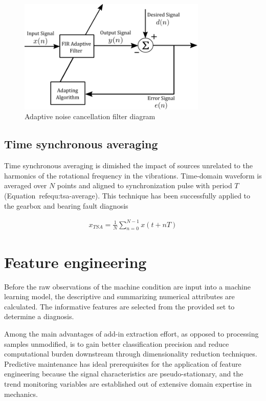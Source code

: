 \begin{figure}[h]
	\centering
	\includegraphics[width=0.8\textwidth]{assets/adaptive-filter.png}
	\caption{Adaptive noise cancellation filter diagram}
	\label{fig:adaptive-filter}
\end{figure}
\bigbreak

\subsection{Time synchronous averaging}
Time synchronous averaging is dimished the impact of sources unrelated to the harmonics of the rotational frequency in the vibrations. Time-domain waveform is averaged over $N$ points and aligned to synchronization pulse with period $T$ (Equation~ref{equ:tsa-average}). This technique has been successfully applied to the gearbox and bearing fault diagnosis~\cite{davies_handbook_2012,nandi_condition_2019}
\begin{ceqn}\begin{align}
x_{TSA} = \frac{1}{N} \sum_{n = 0}^{N - 1}{x(t + nT)}
\label{equ:tsa-average}
\end{align}\end{ceqn}

\section{Feature engineering}
Before the raw observations of the machine condition are input into a machine learning model, the descriptive and summarizing numerical attributes are calculated. The informative features are selected from the provided set to determine a diagnosis.

Among the main advantages of add-in extraction effort, as opposed to processing samples unmodified, is to gain better classification precision and reduce computational burden downstream through dimensionality reduction techniques. Predictive maintenance has ideal prerequisites for the application of feature engineering because the signal characteristics are pseudo-stationary, and the trend monitoring variables are established out of extensive domain expertise in mechanics.

